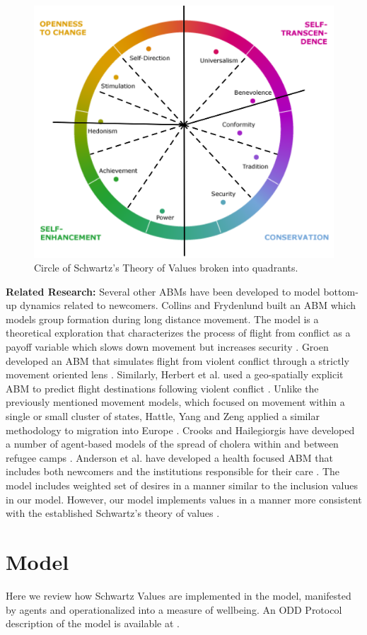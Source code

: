 \documentclass{scspaperproc}
\theoremstyle{scsthe}
\begin{document}
\begin{figure}[htb]
{
\centering
\includegraphics[width=0.40\columnwidth]{Color-Value-Circle.png}
\caption{Circle of Schwartz's Theory of Values broken into quadrants.}
\label{fig:val-circle}
}
\end{figure}

{\bf Related Research:} Several other ABMs have been developed to model bottom-up dynamics related to newcomers. Collins and Frydenlund built an ABM which models group formation during long distance movement. The model is a theoretical exploration that characterizes the process of flight from conflict as a payoff variable which slows down movement but increases security \cite{22}. Groen developed an ABM that simulates flight from violent conflict through a strictly movement oriented lens \cite{37}. Similarly, Herbert et al. used a geo-spatially explicit ABM to predict flight destinations following violent conflict \cite{43}. Unlike the previously mentioned movement models, which focused on movement within a single or small cluster of states, Hattle, Yang and Zeng applied a similar methodology to migration into Europe \cite{42}. Crooks and Hailegiorgis have developed a number of agent-based models of the spread of cholera within and between refugee camps \cite{28,38}. Anderson et al. have developed a health focused ABM that includes both newcomers and the institutions responsible for their care \cite{4}. The model includes weighted set of desires in a manner similar to the inclusion values in our model. However, our model implements values in a manner more consistent with the established Schwartz's theory of values \cite{phil.masters.thesis}.

\section{Model}

Here we review how Schwartz Values are implemented in the model, manifested by agents and operationalized into a measure of wellbeing. An ODD Protocol description of the model is available at \cite{phil.masters.thesis}.
\end{document}
